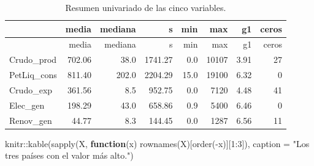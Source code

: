 \documentclass[oneside, openany, fontset=libertinus]{mitthesis}
\newenvironment{Shaded}{\begin{snugshade}}{\end{snugshade}}
\newcommand{\AttributeTok}[1]{\textcolor[rgb]{0.40,0.45,0.13}{#1}}
\newcommand{\ControlFlowTok}[1]{\textcolor[rgb]{0.00,0.23,0.31}{\textbf{#1}}}
\newcommand{\DecValTok}[1]{\textcolor[rgb]{0.68,0.00,0.00}{#1}}
\newcommand{\FunctionTok}[1]{\textcolor[rgb]{0.28,0.35,0.67}{#1}}
\newcommand{\NormalTok}[1]{\textcolor[rgb]{0.00,0.23,0.31}{#1}}
\newcommand{\SpecialCharTok}[1]{\textcolor[rgb]{0.37,0.37,0.37}{#1}}
\newcommand{\StringTok}[1]{\textcolor[rgb]{0.13,0.47,0.30}{#1}}
\begin{document}
\Needspace{2.12in}

\begin{longtable}[]{@{}lrrrrrrr@{}}
\caption{Resumen univariado de las cinco variables.}\tabularnewline
\toprule\noalign{}
& media & mediana & s & min & max & g1 & ceros \\
\midrule\noalign{}
\endfirsthead
\toprule\noalign{}
& media & mediana & s & min & max & g1 & ceros \\
\midrule\noalign{}
\endhead
\bottomrule\noalign{}
\endlastfoot
Crudo\_prod & 702.06 & 38.0 & 1741.27 & 0.0 & 10107 & 3.91 & 27 \\
PetLiq\_cons & 811.40 & 202.0 & 2204.29 & 15.0 & 19100 & 6.32 & 0 \\
Crudo\_exp & 361.56 & 8.5 & 952.75 & 0.0 & 7120 & 4.48 & 41 \\
Elec\_gen & 198.29 & 43.0 & 658.86 & 0.9 & 5400 & 6.46 & 0 \\
Renov\_gen & 44.77 & 8.3 & 144.45 & 0.0 & 1287 & 6.56 & 11 \\
\end{longtable}

\Needspace{2.09in}

\begin{Shaded}
\begin{Highlighting}[]
\NormalTok{knitr}\SpecialCharTok{::}\FunctionTok{kable}\NormalTok{(}\FunctionTok{sapply}\NormalTok{(X, }\ControlFlowTok{function}\NormalTok{(x) }\FunctionTok{rownames}\NormalTok{(X)[}\FunctionTok{order}\NormalTok{(}\SpecialCharTok{{-}}\NormalTok{x)][}\DecValTok{1}\SpecialCharTok{:}\DecValTok{3}\NormalTok{]),}
             \AttributeTok{caption =} \StringTok{"Los tres países con el valor más alto."}\NormalTok{)}
\end{Highlighting}
\end{Shaded}

\Needspace{1.74in}
\end{document}
